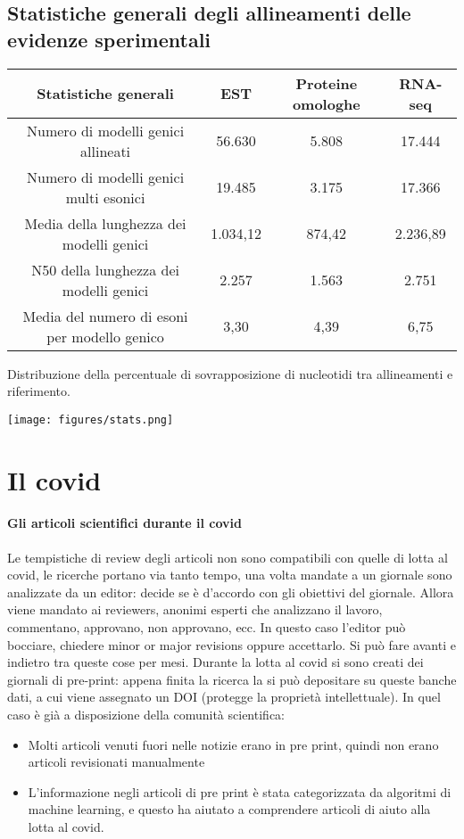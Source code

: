 \documentclass{article}
\begin{document}
\subsection{Statistiche generali degli allineamenti delle evidenze sperimentali}
\begin{center}
    \begin{tabular}{| c | c | c | c}
        \toprule
        \multicolumn{1}{p{2cm}}{\centering Statistiche generali} &
        \multicolumn{1}{p{2cm}}{\centering EST} &
        \multicolumn{1}{p{2cm}}{\centering Proteine omologhe} &
        \multicolumn{1}{p{2cm}}{\centering RNA-seq}\\
        \midrule
        Numero di modelli genici allineati & 56.630 &  5.808 & 17.444\\
        Numero di modelli genici multi esonici & 19.485 & 3.175 & 17.366\\
        Media della lunghezza dei modelli genici & 1.034,12 & 874,42 & 2.236,89\\
        N50 della lunghezza dei modelli genici & 2.257 & 1.563 & 2.751\\
        Media del numero di esoni per modello genico & 3,30 & 4,39 & 6,75\\
    \end{tabular}
\end{center}   
Distribuzione della percentuale di sovrapposizione di nucleotidi tra allineamenti e riferimento.
\begin{center}
    \texttt{[image: figures/stats.png]}
\end{center}

\section{Il covid}
\paragraph{Gli articoli scientifici durante il covid}
Le tempistiche di review degli articoli non sono compatibili con quelle di lotta al covid, le ricerche portano via tanto tempo, una volta mandate a un giornale sono analizzate da un editor: decide se è d’accordo con gli obiettivi del giornale. Allora viene mandato ai reviewers, anonimi esperti che analizzano il lavoro, commentano, approvano, non approvano, ecc. In questo caso l’editor può bocciare, chiedere minor or major revisions oppure accettarlo. Si può fare avanti e indietro tra queste cose per mesi.
Durante la lotta al covid si sono creati dei giornali di pre-print: appena finita la ricerca la si può depositare su queste banche dati, a cui viene assegnato un DOI (protegge la proprietà intellettuale). In quel caso è già a disposizione della comunità scientifica: 
\begin{itemize}
    \item Molti articoli venuti fuori nelle notizie erano in pre print, quindi non erano articoli revisionati manualmente
    \item L’informazione negli articoli di pre print è stata categorizzata da algoritmi di machine learning, e questo ha aiutato a comprendere articoli di aiuto alla lotta al covid.
\end{itemize}
\end{document}
